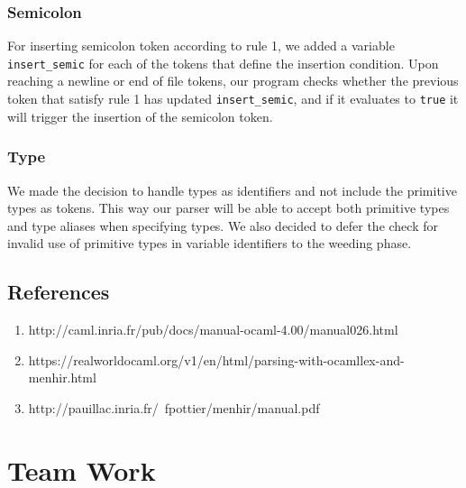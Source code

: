 \documentclass{article}
\begin{document}
\subsubsection*{Semicolon}
For inserting semicolon token according to rule 1, we added a variable \verb|insert_semic| for each of the tokens that define the insertion condition. Upon reaching a newline or end of file tokens, our program checks whether the previous token that satisfy rule 1 has updated \verb|insert_semic|, and if it evaluates to \verb|true| it will trigger the insertion of the semicolon token.

\subsubsection*{Type}
We made the decision to handle types as identifiers and not include the primitive types as tokens. This way our parser will be able to accept both primitive types and type aliases when specifying types. We also decided to defer the check for invalid use of primitive types in variable identifiers to the weeding phase.

\subsection*{References}
\begin{enumerate}
  \item http://caml.inria.fr/pub/docs/manual-ocaml-4.00/manual026.html
  \item https://realworldocaml.org/v1/en/html/parsing-with-ocamllex-and-menhir.html
  \item http://pauillac.inria.fr/~fpottier/menhir/manual.pdf
\end{enumerate}

\section*{Team Work}
\end{document}

